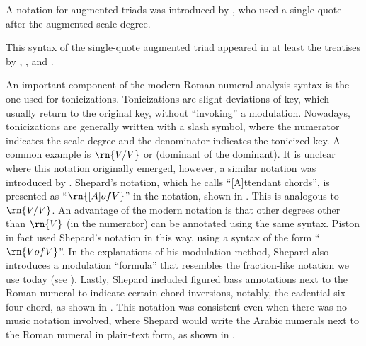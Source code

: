 
A notation for augmented triads was introduced by
\textcite{jadassohn1883lehrbuch}, who used a single quote
after the augmented scale degree.


This syntax of the single-quote augmented triad appeared in
at least the treatises by \textcite{broekhoven1889system},
\textcite{buwa1893schule}, and
\textcite{shepard1896harmony}.


An important component of the modern Roman numeral analysis
syntax is the one used for tonicizations. Tonicizations are
slight deviations of key, which usually return to the
original key, without ``invoking'' a modulation. Nowadays,
tonicizations are generally written with a slash symbol,
where the numerator indicates the scale degree and the
denominator indicates the tonicized key. A common example is
$\rn{V/V}$ or (dominant of the dominant). It is unclear
where this notation originally emerged, however, a similar
notation was introduced by \textcite{shepard1889how}.
Shepard's notation, which he calls ``[A]ttendant chords'',
is presented as ``$\rn{[A] of V}$'' in the notation, shown
in . This
is analogous to $\rn{V/V}$. An advantage of the modern
notation is that other degrees other than $\rn{V}$ (in the
numerator) can be annotated using the same syntax. Piston in
fact used Shepard's notation in this way, using a syntax of
the form ``$\rn{V of V}$''. In the explanations of his
modulation method, Shepard also introduces a modulation
``formula'' that resembles the fraction-like notation we use
today (see
). Lastly,
Shepard included figured bass annotations next to the Roman
numeral to indicate certain chord inversions, notably, the
cadential six-four chord, as shown in
. This
notation was consistent even when there was no music
notation involved, where Shepard would write the Arabic
numerals next to the Roman numeral in plain-text form, as
shown in
.

